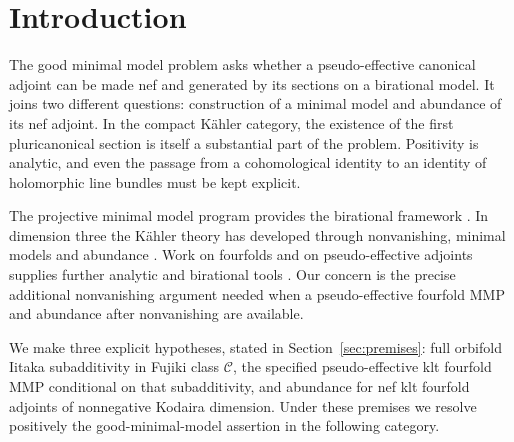 \section{Introduction}\label{sec:introduction}

The good minimal model problem asks whether a pseudo-effective
canonical adjoint can be made nef and generated by its sections on a
birational model. It joins two different questions: construction of a
minimal model and abundance of its nef adjoint. In the compact
K\"ahler category, the existence of the first pluricanonical section
is itself a substantial part of the problem. Positivity is analytic,
and even the passage from a cohomological identity to an identity of
holomorphic line bundles must be kept explicit.

The projective minimal model program provides the birational framework
\cite{BirationalGeometry,BCHM}. In dimension three the K\"ahler
theory has developed through nonvanishing, minimal models and
abundance \cite{DemaillyPeternellNonvanishing,HPMinimalModels,
CHPAbundance,CHPAbundanceErratum,GuenanciaPaunBogomolovGieseker}.
Work on fourfolds and on
pseudo-effective adjoints supplies further analytic and birational
tools \cite{DHPFourfoldMMP,HLLNonvanishing}. Our concern is the
precise additional nonvanishing argument needed when a
pseudo-effective fourfold MMP and abundance after nonvanishing are
available.

We make three explicit hypotheses, stated in
Section~\ref{sec:premises}: full orbifold Iitaka subadditivity in
Fujiki class \(\mathcal C\), the specified pseudo-effective klt
fourfold MMP conditional on that subadditivity, and abundance for nef
klt fourfold adjoints of nonnegative Kodaira dimension. Under these
premises we resolve positively the good-minimal-model assertion in
the following category.

